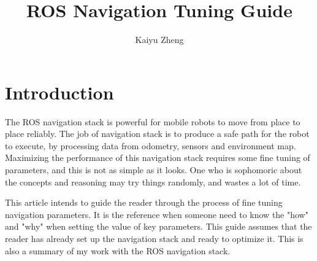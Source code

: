 \documentclass[12pt]{article}
\author{Kaiyu Zheng}
\title{ROS Navigation Tuning Guide}
\begin{document}
\maketitle

\section*{Introduction}
The ROS navigation stack is powerful for mobile robots to move from place to place reliably. The job of navigation stack is to produce a safe path for the robot to execute, by processing data from odometry, sensors and environment map. Maximizing the performance of this navigation stack requires some fine tuning of parameters, and this is not as simple as it looks. One who is sophomoric about the concepts and reasoning may try things randomly, and wastes a lot of time.

This article intends to guide the reader through the process of fine tuning navigation parameters. It is the reference when someone need to know the "how" and "why" when setting the value of key parameters. This guide assumes that the reader has already set up the navigation stack and ready to optimize it. This is also a summary of my work with the ROS navigation stack.\\
\end{document}
